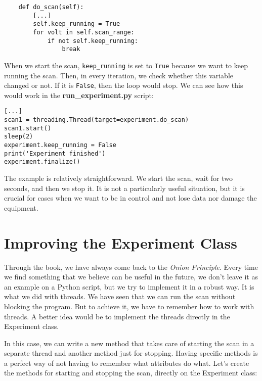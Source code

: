\begin{verbatim}
    def do_scan(self):
        [...]
        self.keep_running = True
        for volt in self.scan_range:
            if not self.keep_running:
                break
\end{verbatim}
When we start the scan, \texttt{keep\_running} is set to \texttt{True} because we want to keep running the scan. Then, in every iteration, we check whether this variable changed or not. If it is \texttt{False}, then the loop would stop. We can see how this would work in the \textbf{run\_experiment.py} script:

\begin{verbatim}
[...]
scan1 = threading.Thread(target=experiment.do_scan)
scan1.start()
sleep(2)
experiment.keep_running = False
print('Experiment finished')
experiment.finalize()
\end{verbatim}

The example is relatively straightforward. We start the scan, wait for two seconds, and then we stop it. It is not a particularly useful situation, but it is crucial for cases when we want to be in control and not lose data nor damage the equipment.


\section{Improving the Experiment Class}\label{sec:improving-experiment}
Through the book, we have always come back to the \emph{Onion Principle}. Every time we find something that we believe can be useful in the future, we don't leave it as an example on a Python script, but we try to implement it in a robust way. It is what we did with threads. We have seen that we can run the scan without blocking the program. But to achieve it, we have to remember how to work with threads. A better idea would be to implement the threads directly in the Experiment class.

In this case, we can write a new method that takes care of starting the scan in a separate thread and another method just for stopping. Having specific methods is a perfect way of not having to remember what attributes do what. Let's create the methods for starting and stopping the scan, directly on the Experiment class:

